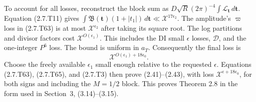 To account for all losses, reconstruct the block sum as
$D\sqrt R(2\pi)^{-4}\int\mathcal L_{\mathbf t}\,d\mathbf t$.
Equation (2.7.T11) gives
$\int\mathfrak B(\mathbf t)(1+|t_1|)\,d\mathbf t
\ll\mathcal X^{17\epsilon_2}$.
The amplitude's $\varpi$ loss in (2.7.T63) is at most
$\mathcal X^{\epsilon_2}$ after taking its square root.
The log partitions and divisor factors cost $\mathcal X^{O(\epsilon_1)}$. This includes the DI small $\epsilon$ losses, $\mathcal D$, and the one-integer $P^6$ loss. The bound is uniform in $a_T$.
Consequently the final loss is
\[
\mathcal X^{O(\epsilon_1)+18\epsilon_0}.
\tag{2.7.T66}\label{p1:eq:2.7.T66}
\]
Choose the freely available $\epsilon_1$ small enough relative
to the requested $\epsilon$. Equations (2.7.T63), (2.7.T65), and (2.7.T3)
then prove (2.41)--(2.43), with loss
$\mathcal X^{\epsilon+18\epsilon_0}$, for both signs and
including the $M=1/2$ block. This proves Theorem 2.8 in the form used in Section~3, (3.14)--(3.15).

